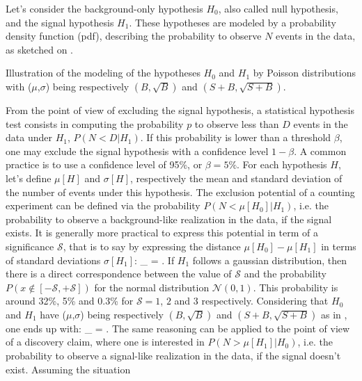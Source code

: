     Let's consider the background-only hypothesis $H_0$, also called null hypothesis,
    and the signal hypothesis $H_1$. These hypotheses are modeled by a probability density
    function (pdf), describing the probability to observe $N$ events in the data, as
    sketched on .

                 {Illustration of the modeling of the hypotheses $H_0$ and $H_1$
                 by Poisson distributions with ($\mu$,$\sigma$) being respectively
                 $(B,\sqrt{B})$ and $(S+B,\sqrt{S+B})$.}

    From the point of view of excluding the signal hypothesis, a statistical hypothesis
    test consists in computing the probability $p$ to observe less than $D$ events in the
    data under $H_1$, $P(N < D|H_1)$. If this probability is lower than a threshold
    $\beta$, one may exclude the signal hypothesis with a confidence level $1-\beta$. A
    common practice is to use a confidence level of 95\%, or $\beta = 5\%$. For each
    hypothesis $H$, let's define $\mu[H]$ and $\sigma[H]$, respectively the mean and
    standard deviation of the number of events under this hypothesis.
    The exclusion potential of a counting experiment can be defined via the probability $P(N < \mu[H_0]|H_1)$,
    i.e. the probability to observe a background-like realization in the data, if the
    signal exists. It is generally more practical to express this potential in term of a
    significance $\mathcal{S}$, that is to say by expressing the distance $\mu[H_0] -
    \mu[H_1]$ in terms of standard deviations $\sigma[H_1]$:
    {
        _ = \frac{\mu[H_0] - \mu[H_1]}{\sigma[H_1]}.
    }
    If $H_1$ follows a gaussian distribution, then there is a direct correspondence
    between the value of $\mathcal{S}$ and the probability $P(x \notin [-\mathcal{S},+\mathcal{S}])$
    for the normal distribution $\mathcal{N}(0,1)$. This probability is around 32\%,
    5\% and 0.3\% for $\mathcal{S} = 1$, $2$ and $3$ respectively.
    Considering that $H_0$ and $H_1$ have ($\mu$,$\sigma$) being respectively
    $(B,\sqrt{B})$ and $(S+B,\sqrt{S+B})$ as in , one ends up
    with:
    {
        _ = .
    }
    The same reasoning can be applied to the point of view of a discovery claim, where
    one is interested in $P(N > \mu[H_1]|H_0)$, i.e. the probability to observe a
    signal-like realization in the data, if the signal doesn't exist. Assuming the situation
